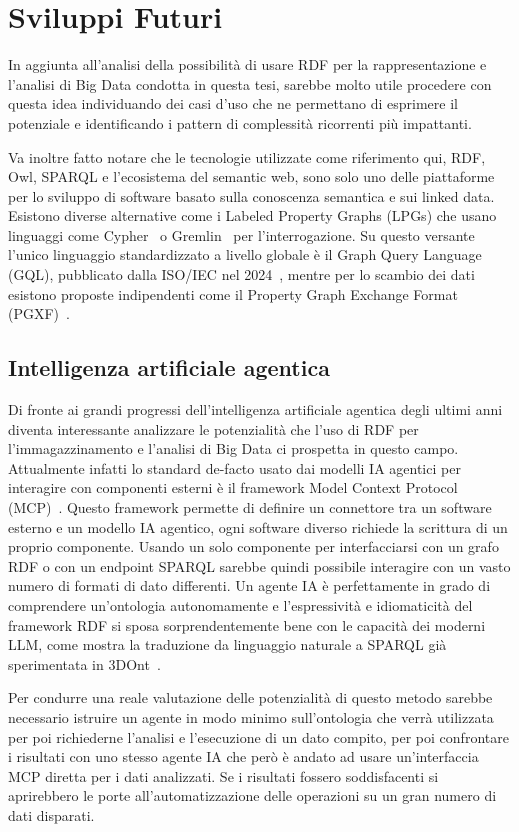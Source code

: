 \section{Sviluppi Futuri}
\label{sec:future_dev}

In aggiunta all'analisi della possibilità di usare RDF per la rappresentazione e l'analisi di Big Data condotta 
in questa tesi, sarebbe molto utile procedere con questa idea individuando dei casi d'uso
che ne permettano di esprimere il potenziale e identificando i pattern di complessità ricorrenti più impattanti.
\par Va inoltre fatto notare che le tecnologie utilizzate come riferimento qui, RDF, Owl, SPARQL e l'ecosistema del semantic web,
sono solo uno delle piattaforme per lo sviluppo di software basato sulla conoscenza semantica e sui linked data. Esistono
diverse alternative come i Labeled Property Graphs (LPGs) che usano linguaggi come Cypher~\cite{francis2018cypher} o
Gremlin~\cite{rodriguez2015gremlin} per l'interrogazione. Su questo versante l'unico linguaggio standardizzato a livello
globale è il Graph Query Language (GQL), pubblicato dalla ISO/IEC nel 2024~\cite{iso-gql}, mentre per lo scambio dei dati
esistono proposte indipendenti come il Property Graph Exchange Format (PGXF)~\cite{chiba2024pgxf}.


\subsection{Intelligenza artificiale agentica}
\label{sec:agentic_ai}

Di fronte ai grandi progressi dell'intelligenza artificiale agentica degli ultimi anni diventa interessante analizzare
le potenzialità che l'uso di RDF per l'immagazzinamento e l'analisi di Big Data ci prospetta in questo campo.
Attualmente infatti lo standard de-facto usato dai modelli IA agentici per interagire con componenti esterni è il
framework Model Context Protocol (MCP)~\cite{mcp-spec}. Questo framework permette di definire un connettore tra un software esterno e un modello
IA agentico, ogni software diverso richiede la scrittura di un proprio componente. Usando un solo componente per interfacciarsi
con un grafo RDF o con un endpoint SPARQL sarebbe quindi possibile interagire con un vasto numero di formati di dato
differenti. Un agente IA è perfettamente in grado di comprendere un'ontologia autonomamente e l'espressività e idiomaticità
del framework RDF si sposa sorprendentemente bene con le capacità dei moderni LLM, come mostra la traduzione da linguaggio
naturale a SPARQL già sperimentata in 3DOnt~\cite{codiglione2025nl2sparql}.
\par Per condurre una reale valutazione delle potenzialità di questo metodo sarebbe necessario istruire un agente in 
modo minimo sull'ontologia che verrà utilizzata per poi richiederne l'analisi e l'esecuzione di un dato compito, per poi
confrontare i risultati con uno stesso agente IA che però è andato ad usare un'interfaccia MCP diretta per i dati analizzati.
Se i risultati fossero soddisfacenti si aprirebbero le porte all'automatizzazione delle operazioni su un gran numero
di dati disparati.
